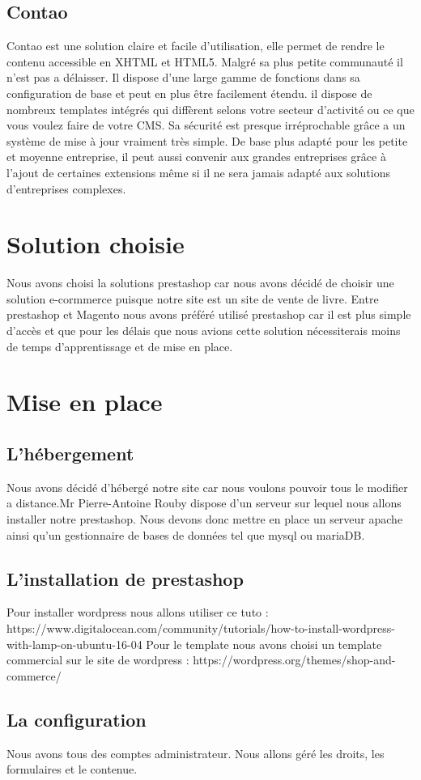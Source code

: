 \documentclass[a4paper,12pt]{report}
\begin{document}
\section{Contao}

Contao est une solution claire et facile d'utilisation, elle permet de
rendre le contenu accessible en XHTML et HTML5. Malgré sa plus petite
communauté il n'est pas a délaisser.  Il dispose d'une large gamme de
fonctions dans sa configuration de base et peut en plus être
facilement étendu. il dispose de nombreux templates intégrés qui
diffèrent selons votre secteur d'activité ou ce que vous voulez faire
de votre CMS.  Sa sécurité est presque irréprochable grâce a un
système de mise à jour vraiment très simple. De base plus adapté pour
les petite et moyenne entreprise, il peut aussi convenir aux grandes
entreprises grâce à l'ajout de certaines extensions même si il ne sera
jamais adapté aux solutions d'entreprises complexes.

\chapter{Solution choisie}

Nous avons choisi la solutions prestashop car nous avons décidé de choisir
une solution e-cormmerce puisque notre site est un site de vente de livre.
Entre prestashop et Magento nous avons préféré utilisé prestashop car il est
plus simple d'accès et que pour les délais que nous avions cette solution
nécessiterais moins de temps d'apprentissage et de mise en place.

\chapter{Mise en place}
\section{L'hébergement}

Nous avons décidé d’hébergé notre site car nous voulons pouvoir tous le
modifier a distance.Mr Pierre-Antoine Rouby dispose d'un serveur sur lequel
nous allons installer notre prestashop. Nous devons donc mettre en place
un serveur apache ainsi qu'un gestionnaire de bases de données tel que mysql ou mariaDB.

\section{L'installation de prestashop}

Pour installer wordpress nous allons utiliser ce tuto :
https://www.digitalocean.com/community/tutorials/how-to-install-wordpress-with-lamp-on-ubuntu-16-04
Pour le template nous avons choisi un template commercial sur le site
de wordpress : https://wordpress.org/themes/shop-and-commerce/

\section{La configuration}

Nous avons tous des comptes administrateur.
Nous allons géré les droits, les formulaires et le contenue. 
\end{document}
